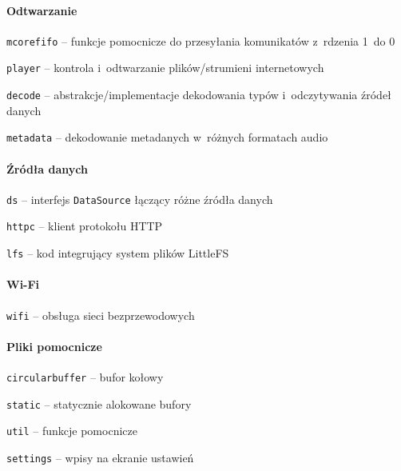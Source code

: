 \documentclass[polish]{aghengthesis}
\let\tempone\itemize
\let\temptwo\enditemize
\renewenvironment{itemize}{\tempone\setlength{\itemsep}{0cm}}{\temptwo}
\begin{document}
			\paragraph{Odtwarzanie}
				\begin{itemize}
					\item \lstinline|mcorefifo| -- funkcje pomocnicze do przesyłania komunikatów z~rdzenia 1~do 0
					\item \lstinline|player| -- kontrola i~odtwarzanie plików/strumieni internetowych
					\begin{itemize}
						\item \lstinline|decode| -- abstrakcje/implementacje dekodowania typów i~odczytywania źródeł danych
						\item \lstinline|metadata| -- dekodowanie metadanych w~różnych formatach audio
					\end{itemize}
				\end{itemize}
		
			\paragraph{Źródła danych}
				\begin{itemize}
					\item \lstinline|ds| -- interfejs \lstinline|DataSource| łączący różne źródła danych
					\item \lstinline|httpc| -- klient protokołu HTTP
					\item \lstinline|lfs| -- kod integrujący system plików LittleFS\textsuperscript{\cite{littlefs}}
				\end{itemize}
			
			\paragraph{Wi-Fi}
				\begin{itemize}
					\item \lstinline|wifi| -- obsługa sieci bezprzewodowych
				\end{itemize}
		
			\paragraph{Pliki pomocnicze}
				\begin{itemize}
					\item \lstinline|circularbuffer| -- bufor kołowy
					\item \lstinline|static| -- statycznie alokowane bufory
					\item \lstinline|util| -- funkcje pomocnicze
					\item \lstinline|settings| -- wpisy na ekranie ustawień
				\end{itemize}
	
\end{document}
